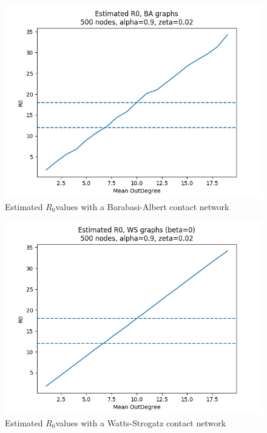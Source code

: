 \documentclass[conference]{IEEEtran}
\newcommand{\ro}{$R_0$}
\begin{document}
\begin{figure}[t]
    \centering
    \includegraphics[scale=0.5]{images/est_ro_ba.png}
    \caption{Estimated \ro values with a Barabasi-Albert contact network}
    \label{fig:r0_ba}
\end{figure}

\begin{figure}[t]
    \centering
    \includegraphics[scale=0.5]{images/est_r0_ws.png}
    \caption{Estimated \ro values with a Watts-Strogatz contact network}
    \label{fig:r0_ws}
\end{figure}
\end{document}
